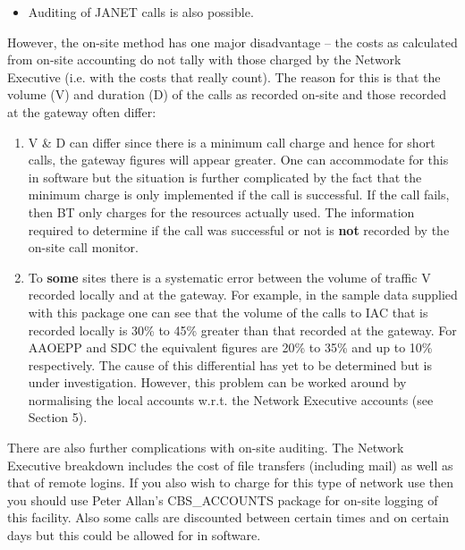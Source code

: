 \begin{enumerate}
\begin{itemize}
\item Auditing of JANET calls is also possible.

\end{itemize}

However, the on-site method has one major disadvantage -- the costs as
calculated from on-site accounting do not tally with those charged by the
Network Executive (i.e. with the costs that really count). The reason for
this is that the volume (V) and duration (D) of the calls as recorded
on-site and those recorded at the gateway often differ: 

\begin{enumerate}

\item 
V \& D can differ since there is a minimum call charge and hence for short
calls, the gateway figures will appear greater.  One can accommodate for this
in software but the situation is further complicated by the fact that the minimum
charge is only implemented if the call is successful. If the call fails,
then BT only charges for the resources actually used. The information
required to determine if the call was successful or not is {\bf not} recorded by
the on-site call monitor. 

\item 
To {\bf some} sites there is a systematic error between the volume of traffic V
recorded locally and at the gateway. For example, in the sample data supplied
with this package one can see that the volume of the calls to IAC
that is recorded locally is 30\% to 45\% greater than that recorded at the
gateway. For AAOEPP and SDC the equivalent figures are 20\% to 35\% and up to 10\%
respectively. The cause of this differential has yet to be determined but is     
under investigation. However, this problem can be worked around 
by normalising the local accounts w.r.t. the Network Executive accounts
(see Section 5).

\end{enumerate}

There are also further complications with on-site auditing. The Network
Executive breakdown includes the cost of file transfers (including mail) as
well as that of remote logins. If you also wish to charge for this type of
network use then you should use Peter Allan's CBS\_\/ACCOUNTS package for
on-site logging of this facility. Also some calls are discounted between
certain times and on certain days but this could be allowed for in software. 

\end{enumerate}

